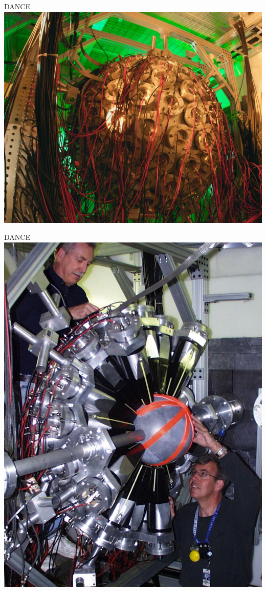 \documentclass{beamer}
\begin{document}
\begin{frame}{DANCE}
\centering
\includegraphics[scale=0.3]{dance1}
\end{frame}

\begin{frame}{DANCE}
\centering
\includegraphics[scale=0.4]{dance2}
\end{frame}
\end{document}
